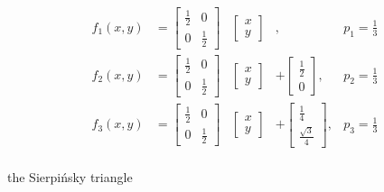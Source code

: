 \documentclass[11pt]{article}
\begin{document}
\begin{ifs}
$$ 
\begin{aligned}
f_1(x, y) &= \begin{bmatrix} \frac{1}{2} & 0 \\ 0 & \frac{1}{2} \end{bmatrix} & \begin{bmatrix} x \\ y \end{bmatrix} & , &p_1 = \frac{1}{3} \\
f_2(x, y) &= \begin{bmatrix} \frac{1}{2} & 0 \\ 0 & \frac{1}{2} \end{bmatrix} & \begin{bmatrix} x \\ y \end{bmatrix} &+ \begin{bmatrix} \frac{1}{2} \\ 0 \end{bmatrix} , &p_2 = \frac{1}{3} \\
f_3(x, y) &= \begin{bmatrix} \frac{1}{2} & 0 \\ 0 & \frac{1}{2} \end{bmatrix} & \begin{bmatrix} x \\ y \end{bmatrix} &+ \begin{bmatrix} \frac{1}{4} \\ \frac{\sqrt{3}}{4} \end{bmatrix} , &p_3 = \frac{1}{3} \\
\end{aligned}
$$

\caption{the Sierpi\'nsky triangle}
\label{ifs:sierpinsky}
\end{ifs}
\end{document}
